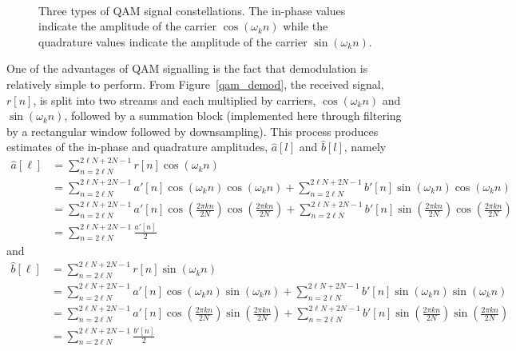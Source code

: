 \documentclass[letterpaper,12pt]{article}
\newcommand{\goodgap}{%
\hspace{\subfigtopskip}%
\hspace{\subfigbottomskip}}
\begin{document}
\begin{figure}
\begin{center}
\goodgap
{}\\
\caption{Three types of QAM signal constellations. The in-phase
values indicate the amplitude of the carrier $\cos(\omega_kn)$
while the quadrature values indicate the amplitude of the carrier
$\sin(\omega_kn)$.}
\end{center}
\end{figure}

One of the advantages of QAM signalling is the fact that
demodulation is relatively simple to perform. From
Figure~\ref{qam_demod}, the received signal, $r[n]$, is split into
two streams and each multiplied by carriers, $\cos(\omega_kn)$ and
$\sin(\omega_kn)$, followed by a summation block (implemented here through
filtering by a
rectangular window followed by downsampling). This process
produces estimates of the in-phase and quadrature amplitudes,
$\hat{a}[l]$ and $\hat{b}[l]$, namely
\begin{equation}\label{a_k_est}\begin{split}
\hat{a}[\ell]&=\sum\limits_{n=2\ell{N}}^{2\ell{N}+2N-1}r[n]\cos(\omega_kn)\\
&=\sum\limits_{n=2\ell{N}}^{2\ell{N}+2N-1}a'[n]\cos(\omega_kn)\cos(\omega_kn)+\sum\limits_{n=2\ell{N}}^{2\ell{N}+2N-1}b'[n]\sin(\omega_kn)\cos(\omega_kn)\\
&=\sum\limits_{n=2\ell{N}}^{2\ell{N}+2N-1}a'[n]\cos\left(\frac{2\pi{k}{n}}{2N}\right)\cos\left(\frac{2\pi{k}{n}}{2N}\right)+\sum\limits_{n=2\ell{N}}^{2\ell{N}+2N-1}b'[n]\sin\left(\frac{2\pi{k}{n}}{2N}\right)\cos\left(\frac{2\pi{k}{n}}{2N}\right)\\
&=\sum\limits_{n=2\ell{N}}^{2\ell{N}+2N-1}\frac{a'[n]}{2}
\end{split}\end{equation} and
\begin{equation}\label{b_k_est}\begin{split}
\hat{b}[\ell]&=\sum\limits_{n=2\ell{N}}^{2\ell{N}+2N-1}r[n]\sin(\omega_kn)\\
&=\sum\limits_{n=2\ell{N}}^{2\ell{N}+2N-1}a'[n]\cos(\omega_kn)\sin(\omega_kn)+\sum\limits_{n=2\ell{N}}^{2\ell{N}+2N-1}b'[n]\sin(\omega_kn)\sin(\omega_kn)\\
&=\sum\limits_{n=2\ell{N}}^{2\ell{N}+2N-1}a'[n]\cos\left(\frac{2\pi{k}{n}}{2N}\right)\sin\left(\frac{2\pi{k}{n}}{2N}\right)+\sum\limits_{n=2\ell{N}}^{2\ell{N}+2N-1}b'[n]\sin\left(\frac{2\pi{k}{n}}{2N}\right)\sin\left(\frac{2\pi{k}{n}}{2N}\right)\\
&=\sum\limits_{n=2\ell{N}}^{2\ell{N}+2N-1}\frac{b'[n]}{2}
\end{split}\end{equation}
\end{document}
